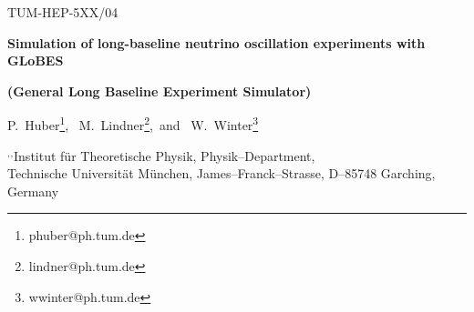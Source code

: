 \documentclass[12pt,a4paper]{article}
\begin{document}

\begin{titlepage}

\renewcommand{\thefootnote}{\alph{footnote}}

\vspace*{-3.cm}
\begin{flushright}
TUM-HEP-5XX/04\\
\end{flushright}

\vspace*{0.5cm}

\renewcommand{\thefootnote}{\fnsymbol{footnote}}
\setcounter{footnote}{-1}

{\begin{center}
{\Large\bf Simulation of long-baseline neutrino oscillation
experiments with GLoBES}
\end{center}}
{\begin{center}
{\large\bf (General Long Baseline Experiment Simulator)}
\end{center}}
\renewcommand{\thefootnote}{\alph{footnote}}

\vspace*{.8cm}
{\begin{center} {\large{\sc
                P.~Huber\footnote[1]{
                phuber@ph.tum.de},~
                M.~Lindner\footnote[2]{
                lindner@ph.tum.de},~and~
                W.~Winter\footnote[3]{
                wwinter@ph.tum.de}
                }}
\end{center}}
\vspace*{0cm}
{\it
\begin{center}

\footnotemark[1]${}^,$\footnotemark[2]${}^,$\footnotemark[3]%
       Institut f\"ur Theoretische Physik, Physik--Department,\\
       Technische Universit\"at M\"unchen,
       James--Franck--Strasse, D--85748 Garching, Germany


\end{center}}

\vspace*{1cm}



\end{titlepage}
\end{document}
